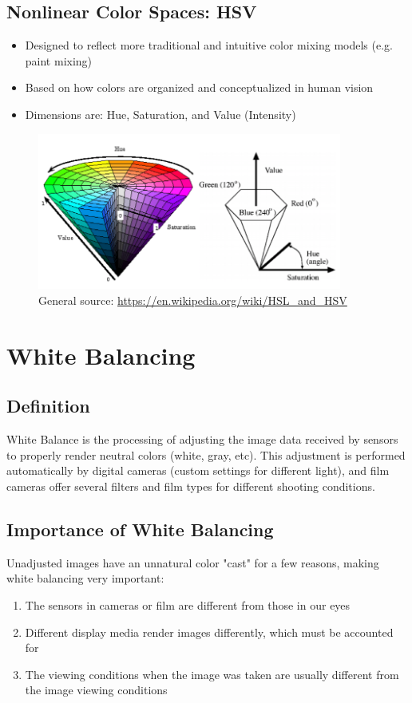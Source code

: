 \documentclass{article}
\begin{document}
\subsection{Nonlinear Color Spaces: HSV}
    \begin{itemize}
	\item Designed to reflect more traditional and intuitive color mixing models (e.g. paint mixing)
    \item Based on how colors are organized and conceptualized in human vision
    \item Dimensions are: Hue, Saturation, and Value (Intensity)
    
\end{itemize}
    
    \begin{figure}[h!]
    \centering
    \includegraphics[width=10cm]{hsv1.png}
    \caption{General source: \url{https://en.wikipedia.org/wiki/HSL_and_HSV}}
    \end{figure}


\section{White Balancing}

\subsection{Definition} White Balance is the processing of adjusting the image data received by sensors to properly render neutral colors (white, gray, etc).  This adjustment is performed automatically by digital cameras (custom settings for different light), and film cameras offer several filters and film types for different shooting conditions.

\subsection{Importance of White Balancing} Unadjusted images have an unnatural color "cast" for a few reasons, making white balancing very important:
\begin{enumerate}
\item The sensors in cameras or film are different from those in our eyes
\item Different display media render images differently, which must be accounted for
\item The viewing conditions when the image was taken are usually different from the image viewing conditions
\end{enumerate}
\end{document}
